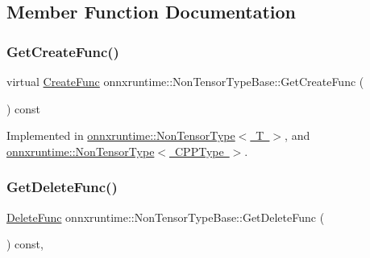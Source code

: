 \subsection{Member Function Documentation}
\mbox{\label{classonnxruntime_1_1NonTensorTypeBase_a770380dc6cea2aeaa02ab04c401f3018}} 
\subsubsection{\texorpdfstring{Get\+Create\+Func()}{GetCreateFunc()}}
{\footnotesize\ttfamily virtual \mbox{\hyperlink{namespaceonnxruntime_a4e4e007092b50ccad0f64e24d7ac3c1e}{Create\+Func}} onnxruntime\+::\+Non\+Tensor\+Type\+Base\+::\+Get\+Create\+Func (\begin{DoxyParamCaption}{ }\end{DoxyParamCaption}) const\hspace{0.3cm}{\ttfamily [pure virtual]}}



Implemented in \mbox{\hyperlink{classonnxruntime_1_1NonTensorType_aa42f5f4e125f8f0b385258cc6f27e9f8}{onnxruntime\+::\+Non\+Tensor\+Type$<$ T $>$}}, and \mbox{\hyperlink{classonnxruntime_1_1NonTensorType_aa42f5f4e125f8f0b385258cc6f27e9f8}{onnxruntime\+::\+Non\+Tensor\+Type$<$ C\+P\+P\+Type $>$}}.

\mbox{\label{classonnxruntime_1_1NonTensorTypeBase_a09fc84f1ff38aa3bc4752a7560fcf902}} 
\subsubsection{\texorpdfstring{Get\+Delete\+Func()}{GetDeleteFunc()}}
{\footnotesize\ttfamily \mbox{\hyperlink{namespaceonnxruntime_a8dcea0e1aa8476e3d09d5a44a0ca4516}{Delete\+Func}} onnxruntime\+::\+Non\+Tensor\+Type\+Base\+::\+Get\+Delete\+Func (\begin{DoxyParamCaption}{ }\end{DoxyParamCaption}) const\hspace{0.3cm}{\ttfamily [override]}, {}}



